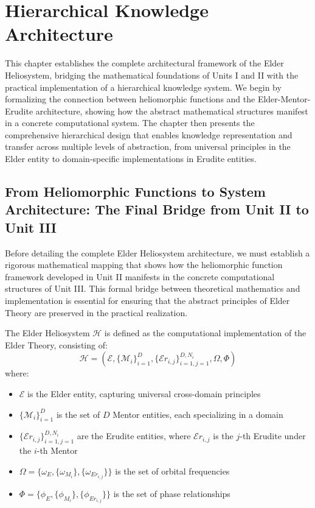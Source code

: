 \chapter{Hierarchical Knowledge Architecture}

\begin{tcolorbox}[colback=PureBlue!5!white,colframe=PureBlue!75!black,title=Chapter Summary]
This chapter establishes the complete architectural framework of the Elder Heliosystem, bridging the mathematical foundations of Units I and II with the practical implementation of a hierarchical knowledge system. We begin by formalizing the connection between heliomorphic functions and the Elder-Mentor-Erudite architecture, showing how the abstract mathematical structures manifest in a concrete computational system. The chapter then presents the comprehensive hierarchical design that enables knowledge representation and transfer across multiple levels of abstraction, from universal principles in the Elder entity to domain-specific implementations in Erudite entities.
\end{tcolorbox}

\section{From Heliomorphic Functions to System Architecture: The Final Bridge from Unit II to Unit III}

Before detailing the complete Elder Heliosystem architecture, we must establish a rigorous mathematical mapping that shows how the heliomorphic function framework developed in Unit II manifests in the concrete computational structures of Unit III. This formal bridge between theoretical mathematics and implementation is essential for ensuring that the abstract principles of Elder Theory are preserved in the practical realization.

\begin{definition}
\label{def:heliosystem_structure}
The Elder Heliosystem $\mathcal{H}$ is defined as the computational implementation of the Elder Theory, consisting of:
\begin{equation}
\mathcal{H} = (\mathcal{E}, \{\mathcal{M}_i\}_{i=1}^D, \{\mathcal{E}r_{i,j}\}_{i=1,j=1}^{D,N_i}, \Omega, \Phi)
\end{equation}
where:
\begin{itemize}
    \item $\mathcal{E}$ is the Elder entity, capturing universal cross-domain principles
    \item $\{\mathcal{M}_i\}_{i=1}^D$ is the set of $D$ Mentor entities, each specializing in a domain
    \item $\{\mathcal{E}r_{i,j}\}_{i=1,j=1}^{D,N_i}$ are the Erudite entities, where $\mathcal{E}r_{i,j}$ is the $j$-th Erudite under the $i$-th Mentor
    \item $\Omega = \{\omega_E, \{\omega_{M_i}\}, \{\omega_{Er_{i,j}}\}\}$ is the set of orbital frequencies
    \item $\Phi = \{\phi_E, \{\phi_{M_i}\}, \{\phi_{Er_{i,j}}\}\}$ is the set of phase relationships
\end{itemize}
\end{definition}

